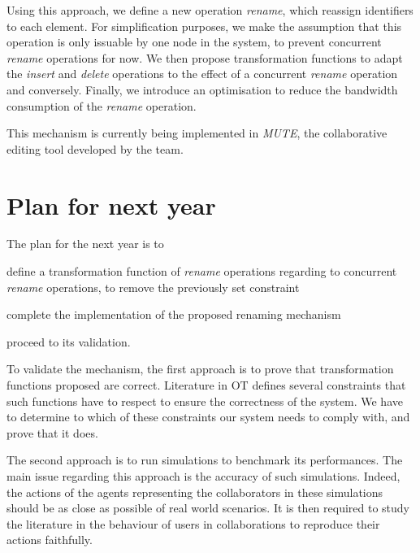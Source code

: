 \documentclass[11pt]{article}
\begin{document}
Using this approach, we define a new operation \emph{rename}, which reassign identifiers to each element.
For simplification purposes, we make the assumption that this operation is only issuable by one node in the system,
to prevent concurrent \emph{rename} operations for now.
We then propose transformation functions to adapt the \emph{insert} and \emph{delete} operations to the effect of a concurrent \emph{rename} operation and conversely.
Finally, we introduce an optimisation to reduce the bandwidth consumption of the \emph{rename} operation.

This mechanism is currently being implemented in \emph{MUTE}, the collaborative editing tool developed by the team.

\section*{Plan for next year}

\hspace{1em} The plan for the next year is to
\begin{enumerate*}
    \item define a transformation function of \emph{rename} operations regarding to concurrent \emph{rename} operations, to remove the previously set constraint
    \item complete the implementation of the proposed renaming mechanism
    \item proceed to its validation.
\end{enumerate*}


To validate the mechanism, the first approach is to prove that transformation functions proposed are correct.
Literature in \ac{OT} defines several constraints that such functions have to respect
to ensure the correctness of the system.
We have to determine to which of these constraints our system needs to comply with, and prove that it does.


The second approach is to run simulations to benchmark its performances.
The main issue regarding this approach is the accuracy of such simulations.
Indeed, the actions of the agents representing the collaborators in these simulations should be as close as possible of real world scenarios.
It is then required to study the literature in the behaviour of users in collaborations to reproduce their actions faithfully.
\end{document}
